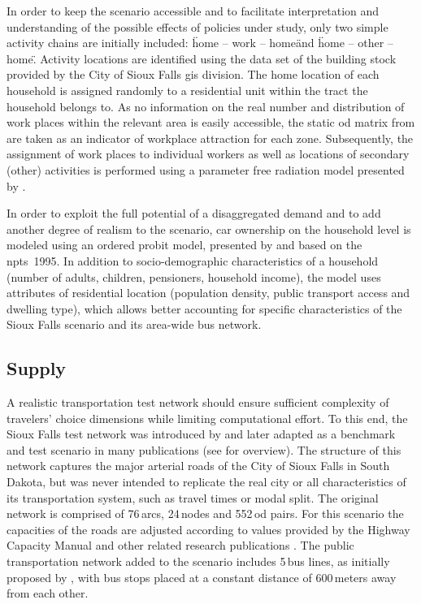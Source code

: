 In order to keep the scenario accessible and to facilitate interpretation and understanding of the possible effects of policies under study, only two simple activity chains are initially included: \"home – work – home\" and \"home – other – home\". Activity locations are identified using the data set of the building stock provided by the City of Sioux Falls \gls{gis} division. The home location of each household is assigned randomly to a residential unit within the tract the household belongs to. As no information on the real number and distribution of work places within the relevant area is easily accessible, the static \gls{od} matrix from \citet[][]{LeBlancEtAl_TransRes_1975} are taken as an indicator of workplace attraction for each zone. Subsequently, the assignment of work places to individual workers as well as locations of secondary (other) activities is performed using a parameter free radiation model presented by \citet[][]{SiminiEtAl_NAT_2012}.

In order to exploit the full potential of a disaggregated demand and to add another degree of realism to the scenario, car ownership on the household level is modeled using an ordered probit model, presented by \citet[][]{GiulianoDargay_TransResA_2006} and based on the \gls{npts}~1995. In addition to socio-demographic characteristics of a household (number of adults, children, pensioners, household income), the model uses attributes of residential location (population density, public transport access and dwelling type), which allows better accounting for specific characteristics of the Sioux Falls scenario and its area-wide bus network. 

\subsection{Supply} 
A realistic transportation test network should ensure sufficient complexity of travelers’ choice dimensions while limiting  computational effort. To this end, the Sioux Falls test network was introduced by \citet[][]{MorlokEtAl_ResRep_org-fhwa_1973} and later adapted as a benchmark and test scenario in many publications (see \citet[][]{ChakirovFourie_TechRep_FCL_2014} for overview). The structure of this network captures the major arterial roads of the City of Sioux Falls in South Dakota, but was never intended to replicate the real city or all characteristics of its transportation system, such as travel times or modal split. The original network is comprised of 76\,arcs, 24\,nodes and 552\,\gls{od} pairs. For this scenario the capacities of the roads are adjusted according to values provided by the Highway Capacity Manual \citet[][]{HCM_2010} and other related research publications \citep[e.g.,][]{NgCFSmall_Transportation_2012}. The public transportation network added to the scenario includes 5\,bus lines, as initially proposed by \citet[][]{AbdulaalLeBlanc_TransScience_1979}, with bus stops placed at a constant distance of 600\,meters away from each other. 

